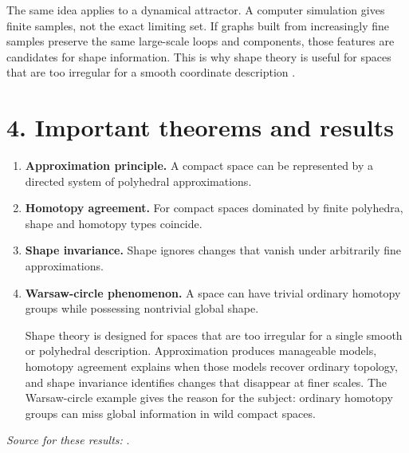 The same idea applies to a dynamical attractor. A computer simulation gives
finite samples, not the exact limiting set. If graphs built from increasingly
fine samples preserve the same large-scale loops and components, those
features are candidates for shape information. This is why shape theory is
useful for spaces that are too irregular for a smooth coordinate description
\cite{shape_ref1,shape_ref2}.

\section*{4. Important theorems and results}
\begin{enumerate}[leftmargin=*,itemsep=0.35em]
\item \textbf{Approximation principle.} A compact space can be represented by a directed system of polyhedral approximations.

\item \textbf{Homotopy agreement.} For compact spaces dominated by finite polyhedra, shape and homotopy types coincide.

\item \textbf{Shape invariance.} Shape ignores changes that vanish under arbitrarily fine approximations.

\item \textbf{Warsaw-circle phenomenon.} A space can have trivial ordinary homotopy groups while possessing nontrivial global shape.

Shape theory is designed for spaces that are too irregular for a single smooth or polyhedral description. Approximation produces manageable models, homotopy agreement explains when those models recover ordinary topology, and shape invariance identifies changes that disappear at finer scales. The Warsaw-circle example gives the reason for the subject: ordinary homotopy groups can miss global information in wild compact spaces.
\end{enumerate}
\noindent\emph{Source for these results:} \cite{shape_ref1}.

